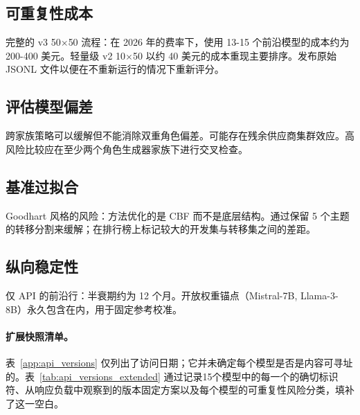 \documentclass[11pt,a4paper,fontset=fandol]{ctexart}
\begin{document}
\subsection*{可重复性成本}
完整的 v3 50$\times$50 流程：在 2026 年的费率下，使用 13-15 个前沿模型的成本约为 200-400 美元。轻量级 v2 10$\times$50 以约 40 美元的成本重现主要排序。发布原始 JSONL 文件以便在不重新运行的情况下重新评分。

\subsection*{评估模型偏差}
跨家族策略可以缓解但不能消除双重角色偏差。可能存在残余供应商集群效应。高风险比较应在至少两个角色生成器家族下进行交叉检查。

\subsection*{基准过拟合}
Goodhart 风格的风险：方法优化的是 CBF 而不是底层结构。通过保留 5 个主题的转移分割来缓解；在排行榜上标记较大的开发集与转移集之间的差距。

\subsection*{纵向稳定性}
仅 API 的前沿行：半衰期约为 12 个月。开放权重锚点（Mistral-7B, Llama-3-8B）永久包含在内，用于固定参考校准。

\paragraph{扩展快照清单。} 表~\ref{app:api_versions} 仅列出了访问日期；它并未确定每个模型是否是内容可寻址的。表~\ref{tab:api_versions_extended} 通过记录15个模型中的每一个的确切标识符、从响应负载中观察到的版本固定方案以及每个模型的可重复性风险分类，填补了这一空白。
\end{document}
